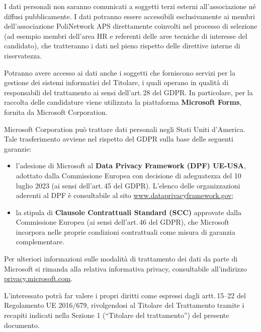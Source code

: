 \documentclass[legal]{core/polinetwork}
\begin{document}

I dati personali non saranno comunicati a soggetti terzi esterni
all'associazione né diffusi pubblicamente. I dati potranno essere
accessibili esclusivamente ai membri dell'associazione PoliNetwork APS
direttamente coinvolti nel processo di selezione (ad esempio membri
dell'area HR e referenti delle aree tecniche di interesse del candidato),
che tratteranno i dati nel pieno rispetto delle direttive interne di
riservatezza.

Potranno avere accesso ai dati anche i soggetti che forniscono servizi per
la gestione dei sistemi informatici del Titolare, i quali operano in
qualità di responsabili del trattamento ai sensi dell'art.\,28 del GDPR.
In particolare, per la raccolta delle candidature viene utilizzata la
piattaforma \textbf{Microsoft Forms}, fornita da Microsoft Corporation.


Microsoft Corporation può trattare dati personali negli Stati Uniti
d'America. Tale trasferimento avviene nel rispetto del GDPR sulla base
delle seguenti garanzie:

\begin{itemize}
  \item l'adesione di Microsoft al \textbf{Data Privacy Framework (DPF)
    UE-USA}, adottato dalla Commissione Europea con decisione di
    adeguatezza del 10 luglio 2023 (ai sensi dell'art.\,45 del GDPR).
    L'elenco delle organizzazioni aderenti al DPF è consultabile al sito
    \href{https://www.dataprivacyframework.gov}{www.dataprivacyframework.gov};
  \item la stipula di \textbf{Clausole Contrattuali Standard (SCC)}
    approvate dalla Commissione Europea (ai sensi dell'art.\,46 del GDPR),
    che Microsoft incorpora nelle proprie condizioni contrattuali come
    misura di garanzia complementare.
\end{itemize}

Per ulteriori informazioni sulle modalità di trattamento dei dati da parte
di Microsoft si rimanda alla relativa informativa privacy, consultabile
all'indirizzo
\href{https://privacy.microsoft.com}{privacy.microsoft.com}.


L'interessato potrà far valere i propri diritti come espressi dagli
artt.\,15--22 del Regolamento UE 2016/679, rivolgendosi al Titolare del
Trattamento tramite i recapiti indicati nella Sezione 1 (``Titolare del
trattamento'') del presente documento.
\end{document}
